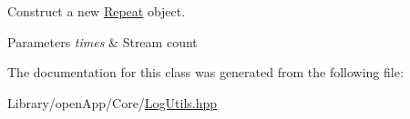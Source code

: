 Construct a new \mbox{\hyperlink{classo_a_1_1_repeat}{Repeat}} object. 


\begin{DoxyParams}{Parameters}
{\em times} & Stream count \\
\hline
\end{DoxyParams}


The documentation for this class was generated from the following file\+:\begin{DoxyCompactItemize}
\item 
Library/open\+App/\+Core/\mbox{\hyperlink{_log_utils_8hpp}{Log\+Utils.\+hpp}}\end{DoxyCompactItemize}
